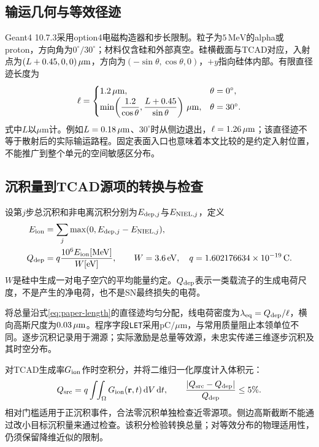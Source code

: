 \subsection{输运几何与等效径迹}
Geant4 10.7.3采用option4电磁构造器和步长限制\cite{g4em}。粒子为$5\,\mathrm{MeV}$的alpha或proton，方向角为$0^\circ/30^\circ$；材料仅含硅和外部真空。硅横截面与TCAD对应，入射点为$(L+0.45,0,0)\,\mu\mathrm{m}$，方向为$(-\sin\theta,\cos\theta,0)$，$+y$指向硅体内部。有限直径迹长度为
\begin{equation}
\ell=\begin{cases}
1.2\,\mu\mathrm{m},&\theta=0^\circ,\\
\min\!\left(\dfrac{1.2}{\cos\theta},\dfrac{L+0.45}{\sin\theta}\right)\,\mu\mathrm{m},&\theta=30^\circ.
\end{cases}
\label{eq:paper-length}
\end{equation}
式中$L$以$\mu\mathrm{m}$计。例如$L=0.18\,\mu\mathrm{m}$、$30^\circ$时从侧边退出，$\ell=1.26\,\mu\mathrm{m}$；该直径迹不等于散射后的实际输运路程。固定表面入口也意味着本文比较的是约定入射位置，不能推广到整个单元的空间敏感区分布。

\subsection{沉积量到TCAD源项的转换与检查}
设第$j$步总沉积和非电离沉积分别为$E_{{\rm dep},j}$与$E_{{\rm NIEL},j}$，定义
\begin{align}
E_{\rm ion}&=\sum_j\max(0,E_{{\rm dep},j}-E_{{\rm NIEL},j}),\\
Q_{\rm dep}&=q\frac{10^6E_{\rm ion}[\mathrm{MeV}]}{W[\mathrm{eV}]},\qquad
W=3.6\,\mathrm{eV},\quad q=1.602176634\times10^{-19}\,\mathrm{C}.
\label{eq:paper-qdep}
\end{align}
$W$是硅中生成一对电子空穴的平均能量约定\cite{ryder2021}。$Q_{\rm dep}$表示一类载流子的生成电荷尺度，不是产生的净电荷，也不是SN最终损失的电荷。

将总量沿式\eqref{eq:paper-length}的直径迹均匀分配，线电荷密度为$\lambda_{\rm eq}=Q_{\rm dep}/\ell$，横向高斯尺度为$0.03\,\mu\mathrm{m}$。程序字段\texttt{LET}采用$\mathrm{pC}/\mu\mathrm{m}$，与常用质量阻止本领单位不同。逐步沉积记录用于溯源；实际激励是总量等效源，未忠实传递三维逐步沉积及其时空分布。

对TCAD生成率$G_{\rm ion}$作时空积分，并将二维归一化厚度计入体积元：
\begin{equation}
Q_{\rm src}=q\int\!\!\int_{\Omega}G_{\rm ion}(\mathbf r,t)\,\mathrm dV\,\mathrm dt,
\qquad \frac{|Q_{\rm src}-Q_{\rm dep}|}{Q_{\rm dep}}\leq5\%.
\label{eq:paper-source}
\end{equation}
相对门槛适用于正沉积事件，合法零沉积单独检查近零源项。侧边高斯截断不能通过改小目标沉积量来通过检查。该积分检验转换总量；对等效分布的物理适用性，仍须保留降维近似的限制。
